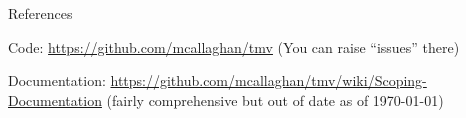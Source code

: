 \documentclass[9pt]{beamer}
\begin{document}
\begin{frame}{References}

\scriptsize

Code: \url{https://github.com/mcallaghan/tmv} (You can raise ``issues'' there)

\medskip

Documentation: \url{https://github.com/mcallaghan/tmv/wiki/Scoping-Documentation} (fairly comprehensive but out of date as of \today)

\medskip


\end{frame}
\end{document}
